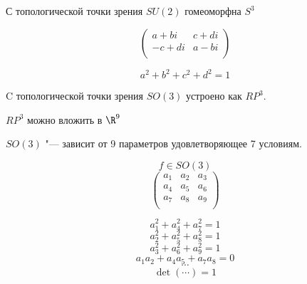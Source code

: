 \begin{Rem}
С топологической точки зрения
$SU(2)$  гомеоморфна $S^3$

$$
\begin{pmatrix}
a + bi & c + di\\
-c + di & a - bi\\
\end{pmatrix}
$$

$$a^2 + b^2 + c^2 + d^2 = 1$$

C топологической точки зрения $SO(3)$  устроено как $RP^3$.

$RP^3$  можно вложить в $\R^9$

$SO(3)$ "--- зависит от 9 параметров удовлетворяющее 7 условиям.

$$f \in SO(3)$$
$$
\begin{pmatrix}
a_1 & a_2 & a_3\\
a_4 & a_5 & a_6\\
a_7 & a_8 & a_9\\
\end{pmatrix}
$$

$$a_1^2 + a_4^2 + a_7^2 = 1$$
$$a_2^2 + a_5^2 + a_8^2 = 1$$
$$a_3^2 + a_6^2 + a_9^2 = 1$$
$$a_1a_2 + a_4a_5 + a_7a_8 = 0$$
$$\cdots$$
$$\det(\cdots) = 1$$
\end{Rem}
